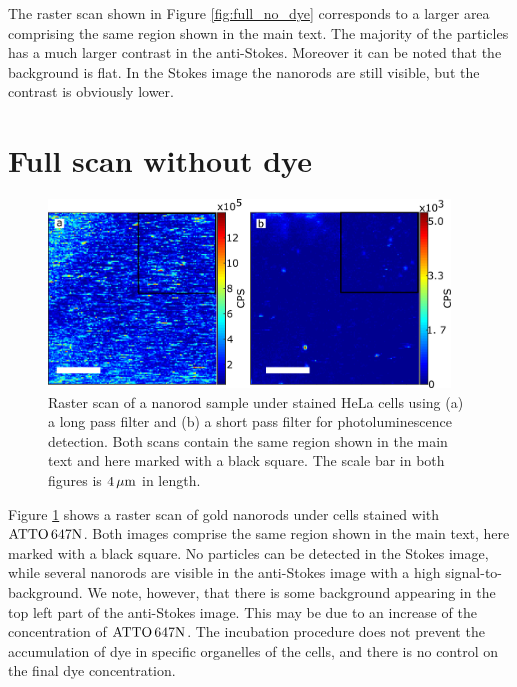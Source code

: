 The raster scan shown in Figure \ref{fig:full_no_dye} corresponds to a larger
area comprising the same region shown in the main text. The majority of the
particles has a much larger contrast in the anti-Stokes. Moreover it can be
noted that the background is flat. In the Stokes image the nanorods are still
visible, but the contrast is obviously lower.

\section{Full scan without dye}
\begin{figure}[htp] \centering
\includegraphics[width=0.95\textwidth]{Chapters/03_Background_Free/Figures/Supplementary/07_Full_scans_dye/full_with_dye.png}
\caption{Raster scan of a nanorod sample under stained HeLa cells using (a) a
long pass filter and (b) a short pass filter for photoluminescence detection. Both scans
contain the same region shown in the main text and here marked with a black
square. The scale bar in both figures is $4\,\mu\textrm{m}$ in length.}
	\label{fig:full_with_dye}
\end{figure}

Figure \ref{fig:full_with_dye} shows a raster scan of gold nanorods under cells
stained with $\textrm{ATTO}\,647\textrm{N}$. Both images comprise the same region shown in the main
text, here marked with a black square. No particles can be detected in the
Stokes image, while several nanorods are visible in the anti-Stokes image with a
high signal-to-background. We note, however, that there is some
background appearing in the top left part of the anti-Stokes image. This may be
due to an increase of the concentration of $\textrm{ATTO}\,647\textrm{N}$. The incubation procedure does
not prevent the accumulation of dye in specific organelles of the cells, and
there is no control on the final dye concentration. 

